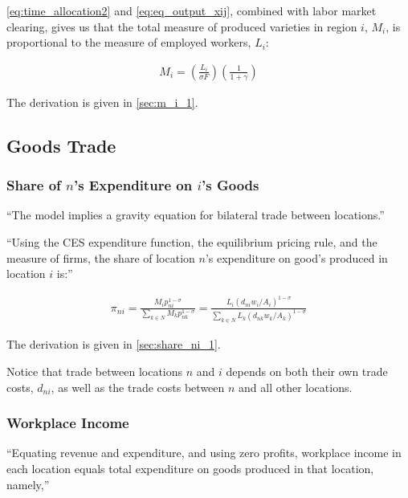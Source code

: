 \documentclass[10pt]{article}
\begin{document}
\eqref{eq:time_allocation2} and \eqref{eq:eq_output_xij},
combined with labor market 
clearing, gives us that 
the total measure of produced varieties in region $i$, $M_i$,
is proportional to the 
measure of employed workers, $L_i$:

\begin{align}
    M_i = \left(\frac{L_i}{\sigma F}\right) \left(\frac{1}{1+\gamma}\right) \label{eq:m_i_1}
\end{align}

The derivation is given in \autoref{sec:m_i_1}.

\subsection{Goods Trade}

\subsubsection{Share of $n$'s Expenditure on $i$'s Goods}

``The model implies a gravity equation 
for bilateral trade between locations.''

``Using the CES expenditure function, the 
equilibrium pricing rule, and the measure 
of firms, the 
share of location $n$'s expenditure on 
good's produced in location $i$ is:''

\begin{align}
    \pi_{n i}=\frac{M_i p_{n i}^{1-\sigma}}{\sum_{k \in N} M_k p_{n k}^{1-\sigma}}=\frac{L_i\left(d_{n i} w_i / A_i\right)^{1-\sigma}}{\sum_{k \in N} L_k\left(d_{n k} w_k / A_k\right)^{1-\sigma}} \label{eq:share_ni_1}
\end{align}

The derivation is given in \autoref{sec:share_ni_1}.

Notice that trade between locations $n$ and $i$
depends on both their own trade costs, $d_{n i}$,
as well as the trade costs between $n$ and all other locations.

\subsubsection{Workplace Income}

``Equating revenue and
expenditure, and using zero profits, workplace income in 
each location equals total expenditure 
on goods produced in that location, namely,''
\end{document}
